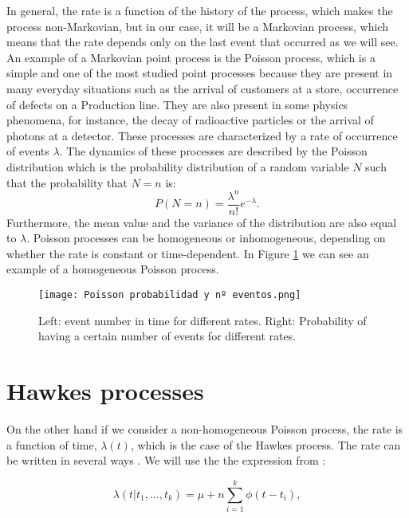 In general, the rate is a function of the history of the process, which makes the process non-Markovian, but in our case, it will be a Markovian process, which means that the rate depends 
only on the last event that occurred as we will see. An example of a Markovian point process is the Poisson process, which is a simple and one of the most studied point processes because 
they are present in many everyday situations such as the arrival of customers at a store, occurrence of defects on a Production line. They are also present in some physics phenomena,
for instance, the decay of radioactive particles or the arrival of photons at a detector. These processes are characterized by a rate of occurrence of events $\lambda$.
The dynamics of these processes are described by the Poisson distribution which is the probability distribution of a random variable $N$ such that the probability that $N= n$ is:
\begin{equation}
    P(N=n) = \dfrac{\lambda^n}{n!}e^{-\lambda}.
    \label{eq: Probabilidad proceso de Poisson homogéneo}
\end{equation}
Furthermore, the mean value and the variance of the distribution are also equal to $\lambda$. Poisson processes can be homogeneous or inhomogeneous, depending on whether the rate is constant
or time-dependent. In Figure \ref{f:poisson} we can see an example of a homogeneous Poisson process.

\begin{figure}[H]
    \centering
    \texttt{[image: Poisson probabilidad y nº eventos.png]}
    \caption{Left: event number in time for different rates. Right: Probability of having a certain number of events for different rates.}
    \label{f:poisson}
\end{figure}

\section{Hawkes processes} \label{sec:Hawkes_processes}

On the other hand if we consider a non-homogeneous Poisson process, the rate is a function of time, $\lambda(t)$, which is the case of the Hawkes process. The rate can be written in several 
ways \cite{notarmuzi2021percolation,kanazawa2021ubiquitous,dassios2013exact,laub2021elements}. We will use the the expression from \cite{notarmuzi2021percolation}:

\begin{equation}
    \lambda(t|t_1, \ldots, t_k) = \mu + n\sum_{i=1}^k \phi (t-t_i),
    \label{eq: Hawkes rate}
\end{equation}

